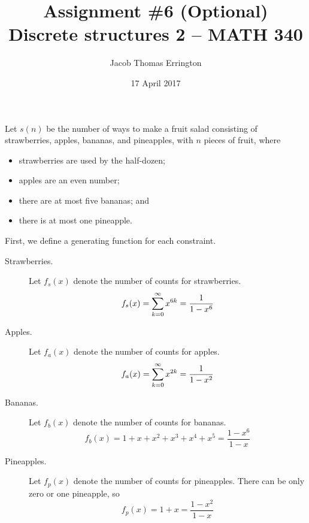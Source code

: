 \documentclass[11pt]{article}
\title{Assignment \#6 (Optional)\\Discrete structures 2 -- MATH 340}
\author{Jacob Thomas Errington}
\date{17 April 2017}
\begin{document}
\maketitle


Let $s(n)$ be the number of ways to make a fruit salad consisting of
strawberries, apples, bananas, and pineapples, with $n$ pieces of
fruit, where
%
\begin{itemize}
    \item strawberries are used by the half-dozen;
    \item apples are an even number;
    \item there are at most five bananas; and
    \item there is at most one pineapple.
\end{itemize}

First, we define a generating function for each constraint.
%
\begin{description}
    \item[Strawberries.]
        Let $f_s(x)$ denote the number of counts for strawberries.
        \begin{equation*}
            f_s(x) = \sum^\infty_{k=0} x^{6k} = \frac{1}{1 - x^6}
        \end{equation*}

    \item[Apples.]
        Let $f_a(x)$ denote the number of counts for apples.
        \begin{equation*}
            f_a(x) = \sum^\infty_{k=0} x^{2k} = \frac{1}{1 - x^2}
        \end{equation*}

    \item[Bananas.]
        Let $f_b(x)$ denote the number of counts for bananas.
        \begin{equation*}
            f_b(x)
            = 1 + x + x^2 + x^3 + x^4 + x^5
            = \frac{1-x^6}{1 - x}
        \end{equation*}

    \item[Pineapples.]
        Let $f_p(x)$ denote the number of counts for pineapples.
        There can be only zero or one pineapple, so
        \begin{equation*}
            f_p(x) = 1 + x = \frac{1 - x^2}{1 - x}
        \end{equation*}
\end{description}
\end{document}
